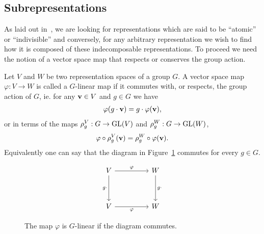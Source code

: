 \subsection{Subrepresentations}\label{sect:subrepr}

As laid out in~\cite[Sect.1.2.]{FultonHarris}, we are looking for representations which are said to be ``atomic'' or ``indivisible'' and conversely, for any arbitrary representation we wish to find how it is composed of these indecomposable representations. To proceed we need the notion of a vector space map that respects or conserves the group action.	

\begin{definition}\cite{FultonHarris}
	Let $V$ and $W$ be two representation spaces of a group $G$. A vector space map 
		$\varphi: V \rightarrow W$
	is called a $G$-linear map if it commutes with, or respects, the group action of $G$, ie. for any $\mathbf{v} \in V$ and $g \in G$ we have
	\begin{align*}
		\varphi( g \cdot \mathbf{v} ) = g \cdot \varphi (\mathbf{v}),
	\end{align*}
	or in terms of the maps $\rho_g^V: G \rightarrow \text{GL}(V)$ and $\rho_g^W: G \rightarrow \text{GL}(W)$,
	\begin{align*}
		\varphi \circ \rho^V_g (\mathbf{v}) = \rho^W_g \circ \varphi (\mathbf{v}).
	\end{align*}
	Equivalently one can say that the diagram in Figure~\ref*{fig:commapmorp} commutes for every $g \in G$.
	\begin{figure}[hbt!]
		\centering
		\[\begin{tikzcd}
			V && W \\
			\\
			V && W
			\arrow["\varphi", from=1-1, to=1-3]
			\arrow["g\cdot"', from=1-1, to=3-1]
			\arrow["g\cdot", from=1-3, to=3-3]
			\arrow["\varphi"', from=3-1, to=3-3]
		\end{tikzcd}\]
		\caption{The map $\varphi$ is $G$-linear if the diagram commutes.}
		\label{fig:commapmorp}
	\end{figure}
\end{definition}

